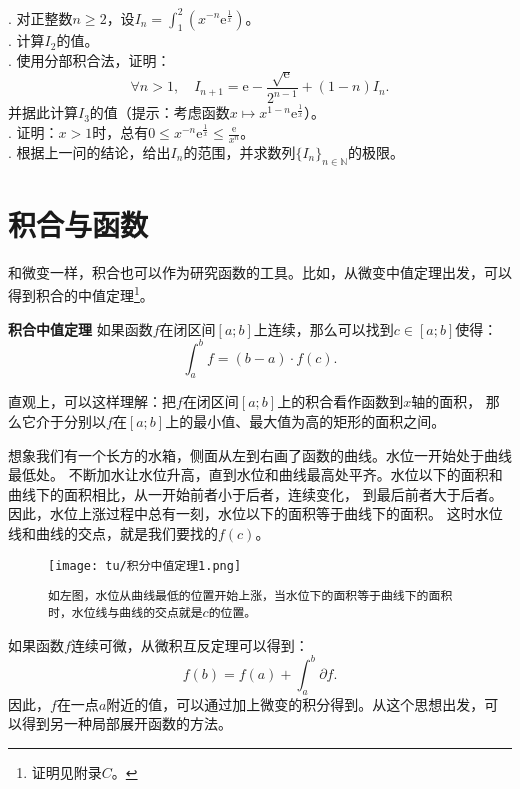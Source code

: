 \documentclass[12pt,UTF8]{ctexbook}
\begin{document}
\begin{xt}
    . 对正整数$n\geqslant 2$，设$\displaystyle I_n = \int_1^2 \left(x^{-n}\mathrm{e}^{\frac{1}{x}}\right)$。\\
    . 计算$I_2$的值。\\
    . 使用分部积合法，证明：
            $$\forall n > 1,\quad I_{n+1} = \mathrm{e} - \frac{\sqrt{\mathrm{e}}}{2^{n-1}} + (1 - n)I_n.$$
    \indent 并据此计算$I_3$的值（提示：考虑函数$x\mapsto x^{1-n}\mathrm{e}^{\frac{1}{x}}$）。\\
    . 证明：$x>1$时，总有$\displaystyle 0\leqslant x^{-n}\mathrm{e}^{\frac{1}{x}} \leqslant \frac{\mathrm{e}}{x^n}$。\\
    . 根据上一问的结论，给出$I_n$的范围，并求数列$\{I_n\}_{n\in\mathbb{N}}$的极限。
\end{xt}

\section{积合与函数}

和微变一样，积合也可以作为研究函数的工具。比如，从微变中值定理出发，可以得到积合的中值定理\footnote{证明见附录$C$。}。

\begin{tm}{\textbf{积合中值定理}}
    如果函数$f$在闭区间$[a; b]$上连续，那么可以找到$c\in[a;b]$使得：
    $$ \int_a^b f = (b - a)\cdot f(c).$$
\end{tm}

直观上，可以这样理解：把$f$在闭区间$[a; b]$上的积合看作函数到$x$轴的面积，
那么它介于分别以$f$在$[a; b]$上的最小值、最大值为高的矩形的面积之间。

想象我们有一个长方的水箱，侧面从左到右画了函数的曲线。水位一开始处于曲线最低处。
不断加水让水位升高，直到水位和曲线最高处平齐。水位以下的面积和曲线下的面积相比，从一开始前者小于后者，连续变化，
到最后前者大于后者。因此，水位上涨过程中总有一刻，水位以下的面积等于曲线下的面积。
这时水位线和曲线的交点，就是我们要找的$f(c)$。

\begin{figure}[h] %
    \vspace{4pt}
    \centering
    \texttt{[image: tu/积分中值定理1.png]}
    \caption*{\texttt{如左图，水位从曲线最低的位置开始上涨，当水位下的面积等于曲线下的面积时，水位线与曲线的交点就是}$c$\texttt{的位置。}}
\end{figure}

如果函数$f$连续可微，从微积互反定理可以得到：
$$ f(b) = f(a) + \int_a^b \partial f .$$
因此，$f$在一点$a$附近的值，可以通过加上微变的积分得到。从这个思想出发，可以得到另一种局部展开函数的方法。
\end{document}
